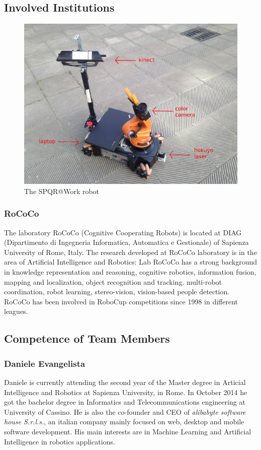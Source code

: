 \documentclass{llncs}
\begin{document}
\subsection{Involved Institutions}
\begin{figure}[t!]
\begin{center}
\includegraphics[width=0.8\linewidth]{images/kuka.JPG}
\end{center}
\caption{The SPQR@Work robot}\label{fig:robot}
\end{figure}

\subsubsection{RoCoCo} The laboratory RoCoCo (Cognitive Cooperating Robots) is located at DIAG (Dipartimento di Ingegneria Informatica, Automatica e Gestionale) of Sapienza University of Rome, Italy.
The research developed at RoCoCo laboratory is in the area of Artificial Intelligence and Robotics: Lab RoCoCo has a strong background in knowledge representation and reasoning, cognitive robotics, information fusion, mapping and localization, object recognition and tracking. multi-robot coordination, robot learning, stereo-vision, vision-based people detection. RoCoCo has been involved in RoboCup competitions since 1998 in different leagues.\\

\subsection{Competence of Team Members}

\subsubsection*{Daniele Evangelista}
Daniele is currently attending the second year of the Master degree in Articial Intelligence and Robotics at Sapienza University, in Rome. 
In October 2014 he got the bachelor degree in Informatics and Telecommunications engineering at University of Cassino. 
He is also the co-founder and CEO of \emph{alibabyte software house S.r.l.s.}, an italian company mainly focused on web, desktop and mobile 
software development. His main interests are in Machine Learning and Artificial Intelligence in robotics applications.
\end{document}
